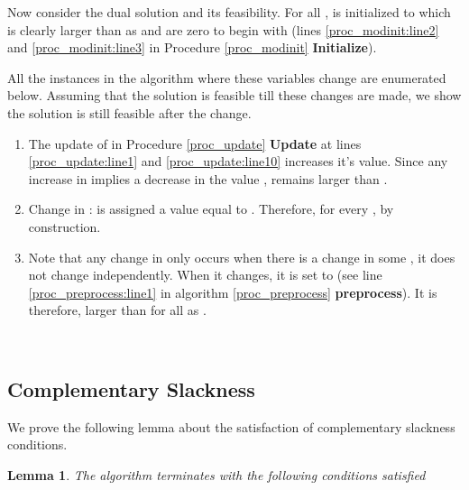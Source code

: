 \documentclass[11pt]{article}
\newenvironment{proof}{\par\noindent{\bf Proof:}}{\mbox{}\hfill\\}
\newtheorem{lemma}{Lemma}[section]
\newcounter{rem}
\begin{document}
\begin{proof}
\begin{enumerate}
\end{enumerate}

Now consider the dual solution and its feasibility. For all ,  is 
initialized to  which is clearly larger than 
 as  and  are
zero to begin with (lines \ref{proc_modinit:line2} and \ref{proc_modinit:line3} in
Procedure \ref{proc_modinit} {\bf Initialize}). 

All the instances in the algorithm where these variables change are enumerated below. 
Assuming that the solution is feasible till these changes are made, we 
show the solution is still feasible after the change. 

\begin{enumerate}

\item
The update of  in Procedure \ref{proc_update}  {\bf Update}
at lines \ref{proc_update:line1} and \ref{proc_update:line10} increases it's value. 
Since any increase in   implies a decrease in the value 
,  remains larger 
than .

\item
Change in  :  is assigned a value 
equal to . Therefore,
for every ,  
by construction.



\item
Note that any change in  only occurs when there is a change
in some , it does not change independently.  When it changes, it is set 
to  (see line 
\ref{proc_preprocess:line1} in algorithm \ref{proc_preprocess} {\bf preprocess}). It is
therefore, larger than  for all  as 
.

\end{enumerate}
\end{proof}

\subsection{Complementary Slackness} We prove the following lemma about
the satisfaction of complementary slackness conditions.

\begin{lemma}
The algorithm terminates with the following conditions satisfied

\label{lemma_BTSapprox}
\end{lemma}
\end{document}
